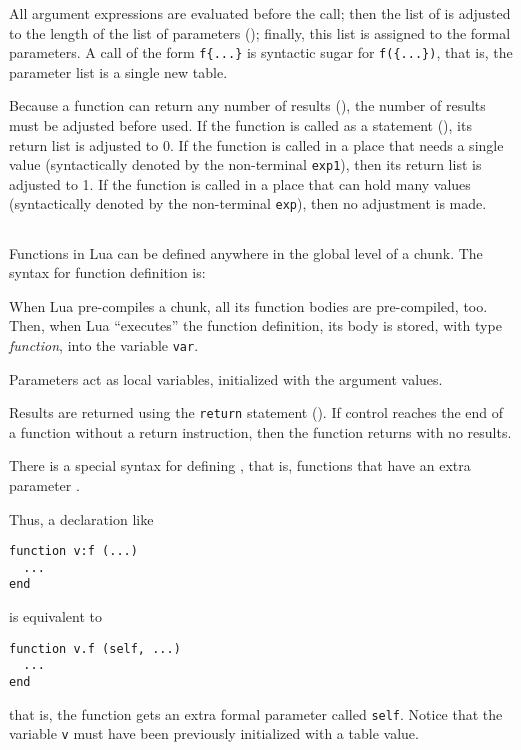 \begin{Produc}
\end{Produc}%
All argument expressions are evaluated before the call;
then the list of  is adjusted to
the length of the list of parameters ();
finally, this list is assigned to the formal parameters.
A call of the form \verb'f{...}' is syntactic sugar for
\verb'f({...})', that is,
the parameter list is a single new table.

Because a function can return any number of results
(),
the number of results must be adjusted before used.
If the function is called as a statement (),
its return list is adjusted to 0.
If the function is called in a place that needs a single value
(syntactically denoted by the non-terminal \verb'exp1'),
then its return list is adjusted to 1.
If the function is called in a place that can hold many values
(syntactically denoted by the non-terminal \verb'exp'),
then no adjustment is made.


\subsection{}

Functions in Lua can be defined anywhere in the global level of a chunk.
The syntax for function definition is:
\begin{Produc}
\end{Produc}

When Lua pre-compiles a chunk,
all its function bodies are pre-compiled, too.
Then, when Lua ``executes'' the function definition,
its body is stored, with type {\em function},
into the variable \verb'var'.

Parameters act as local variables,
initialized with the argument values.
\begin{Produc}
\end{Produc}

Results are returned using the \verb'return' statement ().
If control reaches the end of a function without a return instruction,
then the function returns with no results.

There is a special syntax for defining ,
that is, functions that have an extra parameter .
\begin{Produc}
\end{Produc}%
Thus, a declaration like
\begin{verbatim}
function v:f (...)
  ...
end
\end{verbatim}
is equivalent to
\begin{verbatim}
function v.f (self, ...)
  ...
end
\end{verbatim}
that is, the function gets an extra formal parameter called \verb'self'.
Notice that
the variable \verb'v' must have been previously initialized with a table value.


